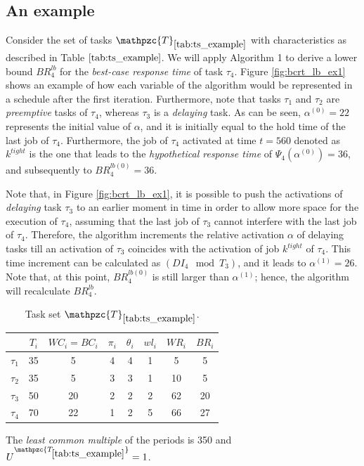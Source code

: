 \documentclass[fleqn]{article}
\begin{document}
\subsection{An example}
Consider the set of tasks $\mathpzc{T}_{\ref{tab:ts_example}}$ with characteristics as described in Table $\ref{tab:ts_example}$. We will apply Algorithm 1 to derive a lower bound $BR^{lb}_4$ for the \textit{best-case response time} of task $\tau_4$. Figure \ref{fig:bcrt_lb_ex1} shows an example of how each variable of the algorithm would be represented in a schedule after the first iteration. Furthermore, note that tasks $\tau_1$ and $\tau_2$ are \textit{preemptive} tasks of $\tau_4$, whereas $\tau_3$ is a \textit{delaying} task. As can be seen, $\alpha^{(0)}=22$ represents the initial value of $\alpha$, and it is initially equal to the hold time of the last job of $\tau_4$. Furthermore, the job of $\tau_4$ activated at time $t=560$ denoted as $k^{tight}$ is the one that leads to the \textit{hypothetical response time} of $\Psi_4(\alpha^{(0)})=36$, and subsequently to $BR_4^{lb(0)}=36$. 

Note that, in Figure \ref{fig:bcrt_lb_ex1}, it is possible to push the activations of \textit{delaying} task $\tau_3$ to an earlier moment in time in order to allow more space for the execution of $\tau_4$, assuming that the last job of $\tau_3$ cannot interfere with the last job of $\tau_4$. Therefore, the algorithm increments the relative activation $\alpha$ of delaying tasks till an activation of $\tau_3$ coincides with the activation of job $k^{tight}$ of $\tau_4$. This time increment can be calculated as $(DI_4 \mod T_3)$, and it leads to $\alpha^{(1)}=26$. Note that, at this point, $BR^{lb (0)}_4$ is still larger than $\alpha^{(1)}$; hence, the algorithm will recalculate $BR^{lb}_4$.


\begin{table}[H]
	\center
	\caption{Task set $\mathpzc{T}_{\ref{tab:ts_example}}$.}
	\label{tab:ts_example}
	\begin{tabular}{c c c c c | c c c}
		\hline 
		& $T_i$ & $WC_i=BC_i$ & $\pi_i$ & $\theta_i$ &  $wl_i$ & $WR_i$ & $BR_i$\\ 
		\hline 
		$\tau_1$& 35 & 5  & 4 & 4 &  1 & 5 & 5\\ 
		$\tau_2$& 35 & 5  & 3 & 3 &  1 & 10 & 5\\ 
		$\tau_3$& 50 & 20 & 2 & 2 &  2 & 62 & 20\\ 
		$\tau_4$& 70 & 22 & 1 & 2 &  5 & 66 & 27\\
		\hline 
	\end{tabular}
	\small
	\item The \textit{least common multiple} of the periods is 350 and $U^{\mathpzc{T_{\ref{tab:ts_example}}}}=1$.
\end{table}
\end{document}
